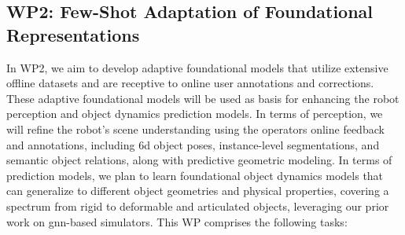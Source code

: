 \documentclass{erc-B2}
\begin{document}
\subsection{WP2: Few-Shot Adaptation of Foundational Representations}
In WP2, we aim to develop adaptive foundational models that utilize extensive offline datasets and are receptive to online user annotations and corrections. These adaptive foundational models  will be used as basis for enhancing the robot perception and object dynamics prediction models. In terms of perception, we will refine the robot's scene understanding using the operators online feedback and annotations, including \gls*{6d} object poses, instance-level segmentations, and semantic object relations, along with predictive geometric modeling. %
In terms of prediction models, we plan to learn foundational object dynamics models that can generalize to different object geometries and physical properties, covering a spectrum from rigid to deformable and articulated objects, leveraging our prior work on \gls*{gnn}-based simulators. This WP comprises the following tasks:
\end{document}
